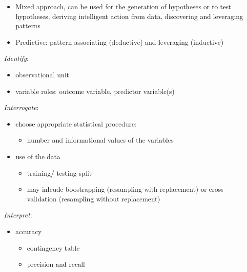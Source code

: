 \documentclass[
]{article}
\providecommand{\tightlist}{%
  \setlength{\itemsep}{0pt}\setlength{\parskip}{0pt}}
\begin{document}
\begin{itemize}
\item
  Mixed approach, can be used for the generation of hypotheses or to test hypotheses, deriving intelligent action from data, discovering and leveraging patterns
\item
  Predictive: pattern associating (deductive) and leveraging (inductive)
\end{itemize}

\emph{Identify}:

\begin{itemize}
\tightlist
\item
  observational unit
\item
  variable roles: outcome variable, predictor variable(s)
\end{itemize}

\emph{Interrogate}:

\begin{itemize}
\tightlist
\item
  choose appropriate statistical procedure:

  \begin{itemize}
  \tightlist
  \item
    number and informational values of the variables
  \end{itemize}
\item
  use of the data

  \begin{itemize}
  \tightlist
  \item
    training/ testing split
  \item
    may inlcude boostrapping (resampling with replacement) or cross-validation (resampling without replacement)
  \end{itemize}
\end{itemize}

\emph{Interpret}:

\begin{itemize}
\tightlist
\item
  accuracy

  \begin{itemize}
  \tightlist
  \item
    contingency table
  \item
    precision and recall
  \end{itemize}
\end{itemize}
\end{document}
